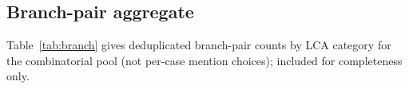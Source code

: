 \documentclass[11pt,a4paper]{article}
\begin{document}
\begin{appendices}
\section{Branch-pair aggregate}
\label{app:branch}

Table~\ref{tab:branch} gives deduplicated branch-pair counts by LCA category for the combinatorial pool (not per-case mention choices); included for completeness only.

\begin{table}[t]
\centering
\footnotesize
\setlength{\tabcolsep}{3.5pt}
\caption{Branch-pair asymmetry by LCA category (selected + total). Not mention-aligned within cases.}
\label{tab:branch}
\end{table}

\end{appendices}
\end{document}
